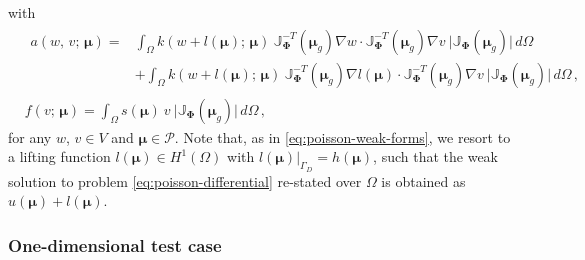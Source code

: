 \documentclass[longtitle]{elsarticle}
\numberwithin{equation}{section}
\theoremstyle{theorem}
\theoremstyle{definition}
\theoremstyle{remark}
\theoremstyle{proposition}
\numberwithin{figure}{section}
\newcommand{\bg}[1]{\boldsymbol{#1}}
\begin{document}
		with
		\vspace*{0.1cm}
		\begin{equation*}
			\begin{aligned}
				&
				\begin{aligned}
				a(w, \, v; \, \bg{\mu}) = & \int_{\Omega} k(w + l(\bg{\mu}); \, \bg{\mu}) ~ \mathbb{J}^{-T}_{\bg{\Phi}}(\bg{\mu}_g) \nabla w \cdot \mathbb{J}^{-T}_{\bg{\Phi}}(\bg{\mu}_g) \nabla v ~ \lvert \mathbb{J}_{\bg{\Phi}}(\bg{\mu}_g) \rvert \, d \Omega \\[0.1cm]
				& + \int_{\Omega} k(w + l(\bg{\mu}); \, \bg{\mu}) ~ \mathbb{J}^{-T}_{\bg{\Phi}}(\bg{\mu}_g) \nabla l(\bg{\mu}) \cdot \mathbb{J}^{-T}_{\bg{\Phi}}(\bg{\mu}_g) \nabla v ~ \lvert \mathbb{J}_{\bg{\Phi}}(\bg{\mu}_g) \rvert \, d \Omega \, ,
				\end{aligned} \\[0.2cm]
				& f(v; \, \bg{\mu}) = \int_{\Omega} s(\bg{\mu}) ~ v ~ \lvert \mathbb{J}_{\bg{\Phi}}(\bg{\mu}_g) \rvert \, d \Omega \, ,  
			\end{aligned}
		\end{equation*}
		for any $w$, $v \in V$ and $\bg{\mu} \in \mathcal{P}$. Note that, as in \eqref{eq:poisson-weak-forms}, we resort to a lifting function $l(\bg{\mu}) \in H^1(\Omega)$ with $l(\bg{\mu}) \big\rvert_{\Gamma_D} = h(\bg{\mu})$, such that the weak solution to problem \eqref{eq:poisson-differential} re-stated over $\Omega$ is obtained as $u(\bg{\mu}) + l(\bg{\mu})$.
		
		
		
	\subsubsection{One-dimensional test case}
	\label{section:One-dimensional test case}
	
\end{document}
